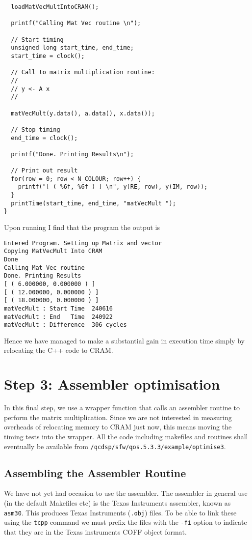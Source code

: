{\begin{verbatim}
  loadMatVecMultIntoCRAM();

  printf("Calling Mat Vec routine \n");

  // Start timing
  unsigned long start_time, end_time;
  start_time = clock();

  // Call to matrix multiplication routine:
  //
  // y <- A x
  //

  matVecMult(y.data(), a.data(), x.data());

  // Stop timing
  end_time = clock();
 
  printf("Done. Printing Results\n");

  // Print out result
  for(row = 0; row < N_COLOUR; row++) {
    printf("[ ( %6f, %6f ) ] \n", y(RE, row), y(IM, row));
  }
  printTime(start_time, end_time, "matVecMult ");
}
\end{verbatim}}

Upon running I find that the program the output is
\begin{verbatim}
Entered Program. Setting up Matrix and vector
Copying MatVecMult Into CRAM
Done
Calling Mat Vec routine 
Done. Printing Results
[ ( 6.000000, 0.000000 ) ] 
[ ( 12.000000, 0.000000 ) ] 
[ ( 18.000000, 0.000000 ) ] 
matVecMult : Start Time  240616
matVecMult : End   Time  240922
matVecMult : Difference  306 cycles
\end{verbatim}

Hence we have managed to make a substantial gain in execution time
simply by relocating the C++ code to CRAM.

\section{Step 3: Assembler optimisation}
In this final step, we use a wrapper function
that calls an assembler routine to perform the matrix multiplication.
Since we are not interested in measuring overheads of relocating 
memory to CRAM just now, this means moving the timing tests into the 
wrapper. All the code including makefiles and routines shall eventually
be available from {\tt /qcdsp/sfw/qos.5.3.3/example/optimise3}.

\subsection{Assembling the Assembler Routine}
We have not yet had occasion to use the assembler. The assembler in 
general use (in the default Makefiles etc) is the Texas Instruments
assembler, known as {\tt asm30}. This produces Texas Instruments
({\tt .obj}) files. To be able to link these using the {\tt tcpp}
command we must prefix the files with the {\tt -fi} option to indicate
that they are in the Texas instruments COFF object format.

